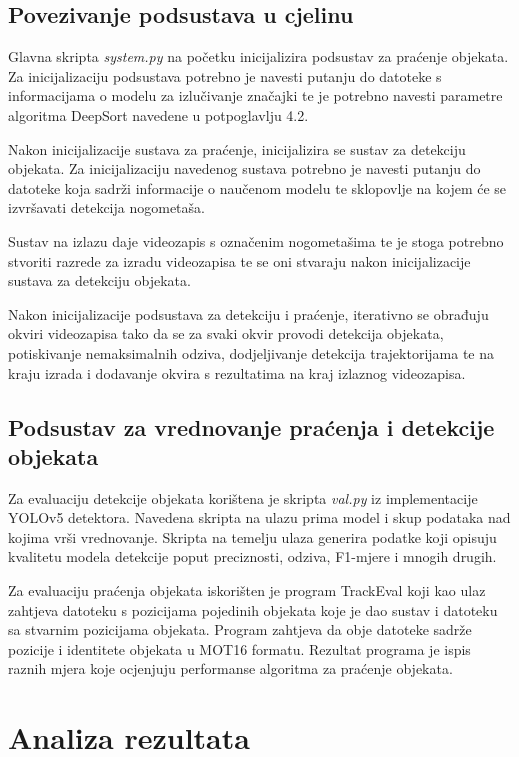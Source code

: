 \documentclass[times, utf8, seminar, numeric]{fer}
\begin{document}
\section{Povezivanje podsustava u cjelinu}

Glavna skripta \textit{system.py} na početku inicijalizira podsustav za praćenje objekata. Za inicijalizaciju podsustava potrebno je navesti putanju do datoteke s informacijama o modelu za izlučivanje značajki te je potrebno navesti parametre algoritma DeepSort navedene u potpoglavlju 4.2.

Nakon inicijalizacije sustava za praćenje, inicijalizira se sustav za detekciju objekata. Za inicijalizaciju navedenog sustava potrebno je navesti putanju do datoteke koja sadrži informacije o naučenom modelu te sklopovlje na kojem će se izvršavati detekcija nogometaša.

Sustav na izlazu daje videozapis s označenim nogometašima te je stoga potrebno stvoriti razrede za izradu videozapisa te se oni stvaraju nakon inicijalizacije sustava za detekciju objekata.

Nakon inicijalizacije podsustava za detekciju i praćenje, iterativno se obrađuju okviri videozapisa tako da se za svaki okvir provodi detekcija objekata, potiskivanje nemaksimalnih odziva, dodjeljivanje detekcija trajektorijama te na kraju izrada i dodavanje okvira s rezultatima na kraj izlaznog videozapisa.

\section{Podsustav za vrednovanje praćenja i detekcije objekata}

Za evaluaciju detekcije objekata korištena je skripta \textit{val.py} iz implementacije YOLOv5 detektora. Navedena skripta na ulazu prima model i skup podataka nad kojima vrši vrednovanje. Skripta na temelju ulaza generira podatke koji opisuju kvalitetu modela detekcije poput preciznosti, odziva, F1-mjere i mnogih drugih.

Za evaluaciju praćenja objekata iskorišten je program TrackEval koji kao ulaz zahtjeva datoteku s pozicijama pojedinih objekata koje je dao sustav i datoteku sa stvarnim pozicijama objekata. Program zahtjeva da obje datoteke sadrže pozicije i identitete objekata u MOT16 formatu.
Rezultat programa je ispis raznih mjera koje ocjenjuju performanse algoritma za praćenje objekata.


\chapter{Analiza rezultata}
\end{document}
